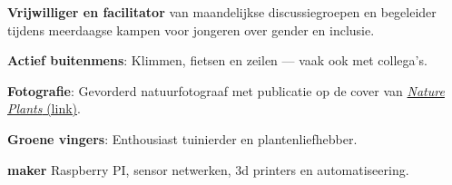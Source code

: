 \documentclass[a4paper,10pt]{article}
\begin{document}
\begin{description}
  \raggedright
  \item \textbf{Vrijwilliger en facilitator} van maandelijkse discussiegroepen en begeleider tijdens meerdaagse kampen voor jongeren over gender en inclusie.
  \item \textbf{Actief buitenmens}: Klimmen, fietsen en zeilen — vaak ook met collega’s.
  \item \textbf{Fotografie}: Gevorderd natuurfotograaf met publicatie op de cover van \href{https://lauralwd.github.io/photography/}{\emph{Nature Plants} (link)}.
  \item \textbf{Groene vingers}: Enthousiast tuinierder en plantenliefhebber.
  \item \textbf{maker} Raspberry PI, sensor netwerken, 3d printers en automatiseering.
\end{description}
\null

\vfill
\end{document}

